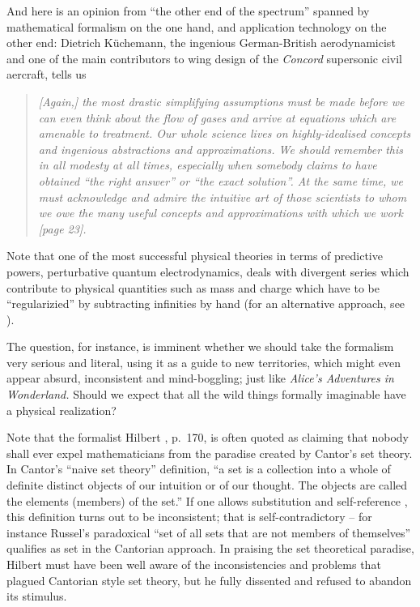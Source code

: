 And here is an opinion from ``the other end of the spectrum'' spanned by mathematical formalism on the one hand,
and application technology on the other end:
Dietrich K\"uchemann,
the ingenious German-British aerodynamicist and
one of the main contributors to wing design of the {\em Concord} supersonic civil aercraft, tells us
\cite{Kuchemann}
\begin{quote}
{\em
[Again,] the most drastic simplifying assumptions must be made before we can even think about
the flow of gases and arrive at equations which are amenable to treatment. Our whole
science lives on highly-idealised concepts and ingenious abstractions and approximations.
We should remember this in all modesty at all times, especially when somebody claims to
have obtained ``the right answer'' or ``the exact solution''.
At the same time, we must acknowledge and admire the intuitive art of those scientists
to whom we owe the many useful concepts and approximations with which we work [page 23].
}
\end{quote}

Note that one of the most successful physical theories in terms of predictive powers,
perturbative quantum electrodynamics,
deals with divergent series \cite{PhysRev.85.631}
which contribute to physical quantities such as mass and charge
which have to be ``regularizied'' by subtracting infinities by hand
(for an alternative approach, see \cite{scharf-finiteQED}).

The question, for instance, is imminent whether we should take the formalism very serious and literal,
using it as a guide to new territories, which might even appear absurd, inconsistent and mind-boggling;
just like {\em Alice's Adventures in Wonderland.}
Should we expect that all the wild things formally imaginable have a physical realization?

Note that the formalist Hilbert \cite{hilbert-26,cantor-set}, p.~170, is often quoted as claiming that
nobody shall  ever expel mathematicians from the paradise created by Cantor's set theory.
In Cantor's ``naive set theory'' definition,
``a set is a collection into a whole of definite distinct objects of
our intuition or of our thought. The objects are called the elements
(members) of the set.''
If one allows  substitution and self-reference \cite{smullyan-78,smullyan-92},
this definition turns out to be inconsistent; that is self-contradictory
--
for instance Russel's paradoxical ``set of all sets that are not members of themselves''
qualifies as set in the Cantorian approach.
In praising the set theoretical paradise, Hilbert must have been well aware of the inconsistencies
and problems that plagued Cantorian style set theory,
but he fully dissented and refused to abandon its stimulus.


